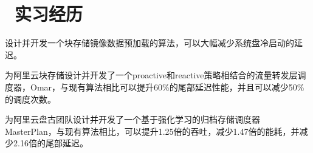 \documentclass{resume}
\begin{document}
\section{\faUsers\ 实习经历}
设计并开发一个块存储镜像数据预加载的算法，可以大幅减少系统盘冷启动的延迟。

为阿里云块存储设计并开发了一个proactive和reactive策略相结合的流量转发层调度器，Omar，与现有算法相比可以提升60\%的尾部延迟性能，并且可以减少50\%的调度次数。

为阿里云盘古团队设计并开发了一个基于强化学习的归档存储调度器MasterPlan，与现有算法相比，可以提升1.25倍的吞吐，减少1.47倍的能耗，并减少2.16倍的尾部延迟。

\end{document}
